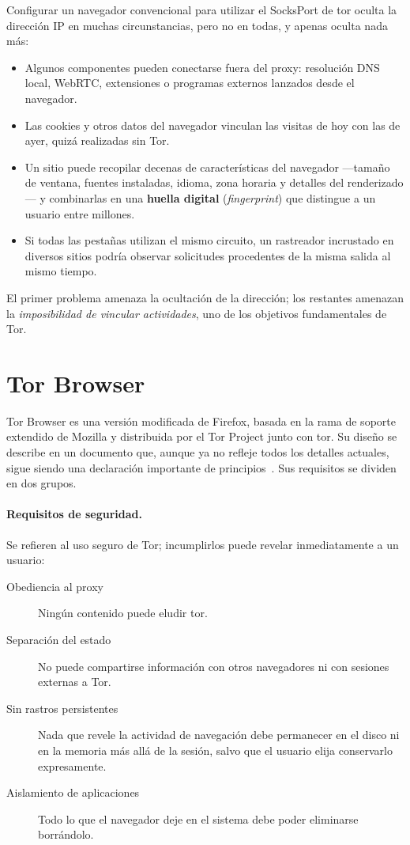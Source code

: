 Configurar un navegador convencional para utilizar el SocksPort de tor oculta la dirección IP en muchas circunstancias, pero no en todas, y apenas oculta nada más:
\begin{itemize}
  \item Algunos componentes pueden conectarse fuera del proxy: resolución DNS local, WebRTC, extensiones o programas externos lanzados desde el navegador.
  \item Las cookies y otros datos del navegador vinculan las visitas de hoy con las de ayer, quizá realizadas sin Tor.
  \item Un sitio puede recopilar decenas de características del navegador ---tamaño de ventana, fuentes instaladas, idioma, zona horaria y detalles del renderizado--- y combinarlas en una \textbf{huella digital} (\emph{fingerprint}) que distingue a un usuario entre millones.
  \item Si todas las pestañas utilizan el mismo circuito, un rastreador incrustado en diversos sitios podría observar solicitudes procedentes de la misma salida al mismo tiempo.
\end{itemize}

El primer problema amenaza la ocultación de la dirección; los restantes amenazan la \emph{imposibilidad de vincular actividades}, uno de los objetivos fundamentales de Tor.

\section{Tor Browser}\label{sec:browser-tb}

Tor Browser es una versión modificada de Firefox, basada en la rama de soporte extendido de Mozilla y distribuida por el Tor Project junto con tor. Su diseño se describe en un documento que, aunque ya no refleje todos los detalles actuales, sigue siendo una declaración importante de principios~\cite{perry2018torbrowser}. Sus requisitos se dividen en dos grupos.

\paragraph{Requisitos de seguridad.} Se refieren al uso seguro de Tor; incumplirlos puede revelar inmediatamente a un usuario:
\begin{description}
  \item[Obediencia al proxy] Ningún contenido puede eludir tor.
  \item[Separación del estado] No puede compartirse información con otros navegadores ni con sesiones externas a Tor.
  \item[Sin rastros persistentes] Nada que revele la actividad de navegación debe permanecer en el disco ni en la memoria más allá de la sesión, salvo que el usuario elija conservarlo expresamente.
  \item[Aislamiento de aplicaciones] Todo lo que el navegador deje en el sistema debe poder eliminarse borrándolo.
\end{description}

